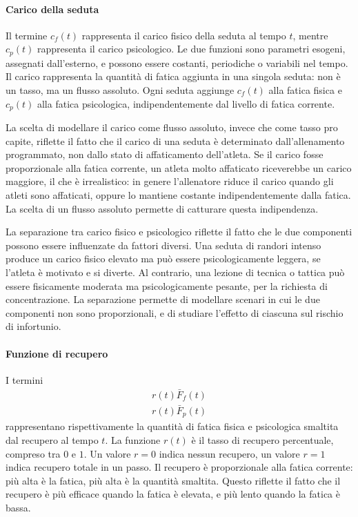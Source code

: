 \paragraph{Carico della seduta}
Il termine $c_f(t)$ rappresenta il carico fisico della seduta al tempo $t$, mentre $c_p(t)$ rappresenta il carico psicologico. Le due funzioni sono parametri esogeni, assegnati dall'esterno, e possono essere costanti, periodiche o variabili nel tempo. Il carico rappresenta la quantità di fatica aggiunta in una singola seduta: non è un tasso, ma un flusso assoluto. Ogni seduta aggiunge $c_f(t)$ alla fatica fisica e $c_p(t)$ alla fatica psicologica, indipendentemente dal livello di fatica corrente. \par

La scelta di modellare il carico come flusso assoluto, invece che come tasso pro capite, riflette il fatto che il carico di una seduta è determinato dall'allenamento programmato, non dallo stato di affaticamento dell'atleta. Se il carico fosse proporzionale alla fatica corrente, un atleta molto affaticato riceverebbe un carico maggiore, il che è irrealistico: in genere l'allenatore riduce il carico quando gli atleti sono affaticati, oppure lo mantiene costante indipendentemente dalla fatica. La scelta di un flusso assoluto permette di catturare questa indipendenza. \par

La separazione tra carico fisico e psicologico riflette il fatto che le due componenti possono essere influenzate da fattori diversi. Una seduta di randori intenso produce un carico fisico elevato ma può essere psicologicamente leggera, se l'atleta è motivato e si diverte. Al contrario, una lezione di tecnica o tattica può essere fisicamente moderata ma psicologicamente pesante, per la richiesta di concentrazione. La separazione permette di modellare scenari in cui le due componenti non sono proporzionali, e di studiare l'effetto di ciascuna sul rischio di infortunio.

\paragraph{Funzione di recupero}
I termini
\begin{gather*}
    r(t) \bar{F}_f(t) \\
    r(t) \bar{F}_p(t)
\end{gather*}
rappresentano rispettivamente la quantità di fatica fisica e psicologica smaltita dal recupero al tempo $t$. La funzione $r(t)$ è il tasso di recupero percentuale, compreso tra $0$ e $1$. Un valore $r=0$ indica nessun recupero, un valore $r=1$ indica recupero totale in un passo. Il recupero è proporzionale alla fatica corrente: più alta è la fatica, più alta è la quantità smaltita. Questo riflette il fatto che il recupero è più efficace quando la fatica è elevata, e più lento quando la fatica è bassa. \par

